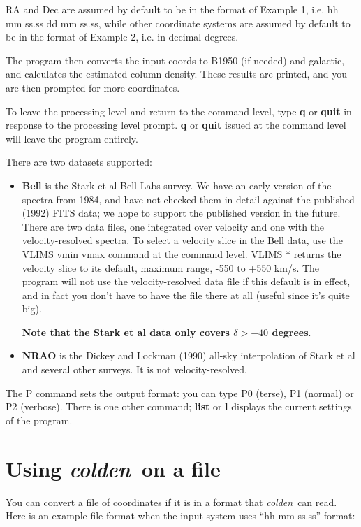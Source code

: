 \documentclass[12pt]{article}
\newcommand{\pr}{{\it colden}~}
\begin{document}
RA and Dec are assumed by default to be in the format of Example 1,
i.e. hh mm ss.ss dd mm ss.ss, while other coordinate systems
are assumed by default to be in the format of Example 2, i.e.
in decimal degrees.

The program then converts the input coords to B1950 (if needed) and
galactic, and calculates the estimated column density. These results
are printed, and you are then prompted for more coordinates.

To leave the processing level and return to the command level, type
{\bf q} or {\bf quit} in response to the processing level prompt.
{\bf q} or {\bf quit} issued at the command 
level will leave the program entirely.

There are two datasets supported:
\begin{itemize} 
\item {\bf Bell} is the Stark et al Bell Labs survey. We have an
early version of the spectra from 1984, and have not checked them
in detail against the published (1992) FITS data; we hope to support the
published version in the future. There are two data files, one integrated
over velocity and one with the velocity-resolved spectra.
To select a velocity slice in the Bell data, use the VLIMS vmin vmax
command at the command level. VLIMS * returns the velocity slice
to its default, maximum range, -550 to +550 km/s. The program will not use
the velocity-resolved data file if this default is in effect, and
in fact you don't have to have the file there at all (useful since it's
quite big). 

{\bf Note that the Stark et al data only covers $\delta>-40$ degrees}.

\item {\bf NRAO} is the Dickey and Lockman (1990) all-sky interpolation
of Stark et al and several other surveys. It is not velocity-resolved.

\end{itemize}

The P command sets the output format: you can type P0 (terse), P1 (normal)
or P2 (verbose).
There is one other command; {\bf list} or {\bf l} displays the
current settings of the program. 


\section{Using \pr on a file}

You can convert a file of coordinates if it is in a format
that \pr can read. Here is an example file format when
the input system uses ``hh mm ss.ss'' format:
\end{document}
